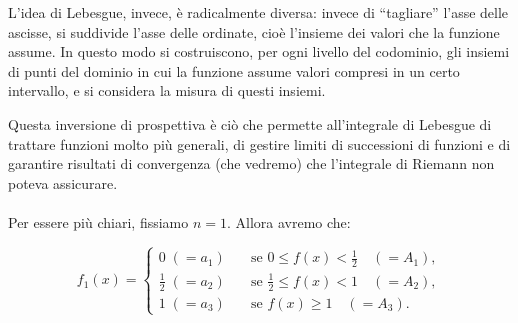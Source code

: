 \medskip
\noindent L’idea di Lebesgue, invece, è radicalmente diversa: invece di “tagliare” l’asse delle ascisse, si suddivide l’asse delle ordinate, cioè l’insieme dei valori che la funzione assume. In questo modo si costruiscono, per ogni livello del codominio, gli insiemi di punti del dominio in cui la funzione assume valori compresi in un certo intervallo, e si considera la misura di questi insiemi.

\medskip
\noindent Questa inversione di prospettiva  è ciò che permette all’integrale di Lebesgue di trattare funzioni molto più generali, di gestire limiti di successioni di funzioni e di garantire risultati di convergenza (che vedremo) che l’integrale di Riemann non poteva assicurare.\\
\\
Per essere più chiari, fissiamo $n=1$. Allora avremo che:

\[
f_1(x) =
\begin{cases}
0 \;(=a_1)
    &\quad \text{se } 0\le f(x) < \tfrac{1}{2} \quad (= A_1),\\[6pt]
\tfrac{1}{2} \;(=a_2) 
    &\quad \text{se } \tfrac{1}{2} \le f(x) < 1 \quad (= A_2),\\[6pt]
1 \;(=a_3)
    &\quad \text{se } f(x) \ge 1 \quad (= A_3).
\end{cases}
\]

